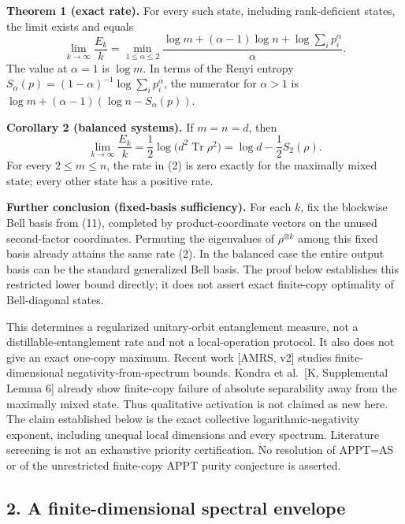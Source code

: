 \documentclass[11pt]{article}
\begin{document}
\textbf{Theorem 1 (exact rate).} For every such state, including rank-deficient states, the limit exists and equals \[
 \boxed{\displaystyle
 \lim_{k\to\infty}\frac{E_k}{k}
 =\min_{1\le\alpha\le2}
 \frac{\log m+(\alpha-1)\log n+
       \log\!\sum_i p_i^\alpha}{\alpha}.}
 \tag{2}
\] The value at \(\alpha=1\) is \(\log m\). In terms of the Renyi entropy \(S_\alpha(p)=(1-\alpha)^{-1}\log\sum_i p_i^\alpha\), the numerator for \(\alpha>1\) is \(\log m+(\alpha-1)(\log n-S_\alpha(p))\).

\textbf{Corollary 2 (balanced systems).} If \(m=n=d\), then \[
 \lim_{k\to\infty}\frac{E_k}{k}
 =\frac12\log\bigl(d^2\operatorname{Tr}\rho^2\bigr)
 =\log d-\frac12S_2(\rho).
 \tag{3}
\] For every \(2\le m\le n\), the rate in (2) is zero exactly for the maximally mixed state; every other state has a positive rate.

\textbf{Further conclusion (fixed-basis sufficiency).} For each \(k\), fix the blockwise Bell basis from (11), completed by product-coordinate vectors on the unused second-factor coordinates. Permuting the eigenvalues of \(\rho^{\otimes k}\) among this fixed basis already attains the same rate (2). In the balanced case the entire output basis can be the standard generalized Bell basis. The proof below establishes this restricted lower bound directly; it does not assert exact finite-copy optimality of Bell-diagonal states.

This determines a regularized unitary-orbit entanglement measure, not a distillable-entanglement rate and not a local-operation protocol. It also does not give an exact one-copy maximum. Recent work {[}AMRS, v2{]} studies finite-dimensional negativity-from-spectrum bounds. Kondra et al.~{[}K, Supplemental Lemma 6{]} already show finite-copy failure of absolute separability away from the maximally mixed state. Thus qualitative activation is not claimed as new here. The claim established below is the exact collective logarithmic-negativity exponent, including unequal local dimensions and every spectrum. Literature screening is not an exhaustive priority certification. No resolution of APPT=AS or of the unrestricted finite-copy APPT purity conjecture is asserted.

\hypertarget{a-finite-dimensional-spectral-envelope}{%
\subsection{2. A finite-dimensional spectral envelope}\label{a-finite-dimensional-spectral-envelope}}
\end{document}
